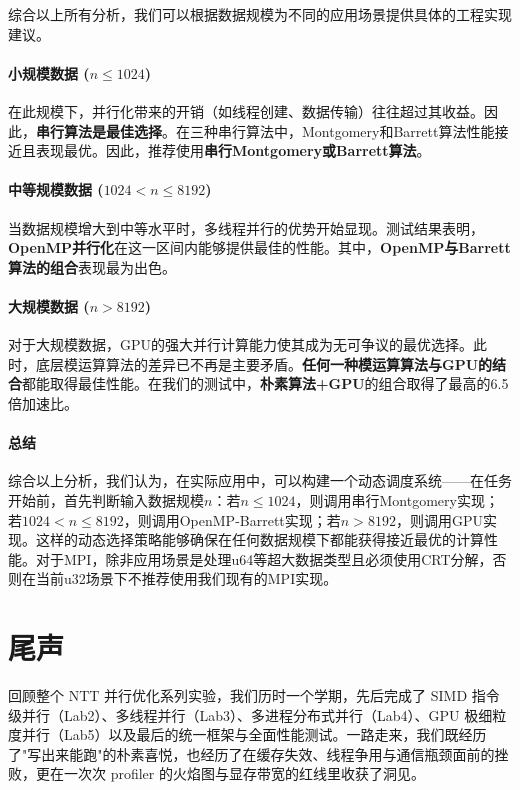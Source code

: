 \documentclass[a4paper]{article}
\begin{document}
综合以上所有分析，我们可以根据数据规模为不同的应用场景提供具体的工程实现建议。

\paragraph{小规模数据 ($n \le 1024$)} 在此规模下，并行化带来的开销（如线程创建、数据传输）往往超过其收益。因此，\textbf{串行算法是最佳选择}。在三种串行算法中，Montgomery和Barrett算法性能接近且表现最优。因此，推荐使用\textbf{串行Montgomery或Barrett算法}。

\paragraph{中等规模数据 ($1024 < n \le 8192$)} 当数据规模增大到中等水平时，多线程并行的优势开始显现。测试结果表明，\textbf{OpenMP并行化}在这一区间内能够提供最佳的性能。其中，\textbf{OpenMP与Barrett算法的组合}表现最为出色。

\paragraph{大规模数据 ($n > 8192$)} 对于大规模数据，GPU的强大并行计算能力使其成为无可争议的最优选择。此时，底层模运算算法的差异已不再是主要矛盾。\textbf{任何一种模运算算法与GPU的结合}都能取得最佳性能。在我们的测试中，\textbf{朴素算法+GPU}的组合取得了最高的6.5倍加速比。

\paragraph{总结}
综合以上分析，我们认为，在实际应用中，可以构建一个动态调度系统——在任务开始前，首先判断输入数据规模$n$：若$n \le 1024$，则调用串行Montgomery实现；若$1024 < n \le 8192$，则调用OpenMP-Barrett实现；若$n > 8192$，则调用GPU实现。这样的动态选择策略能够确保在任何数据规模下都能获得接近最优的计算性能。对于MPI，除非应用场景是处理u64等超大数据类型且必须使用CRT分解，否则在当前u32场景下不推荐使用我们现有的MPI实现。

\section{尾声}

回顾整个 NT​T 并行优化系列实验，我们历时一个学期，先后完成了 SIMD 指令级并行（Lab2）、多线程并行（Lab3）、多进程分布式并行（Lab4）、GPU 极细粒度并行（Lab5）以及最后的统一框架与全面性能测试。一路走来，我们既经历了"写出来能跑"的朴素喜悦，也经历了在缓存失效、线程争用与通信瓶颈面前的挫败，更在一次次 profiler 的火焰图与显存带宽的红线里收获了洞见。
\end{document}
